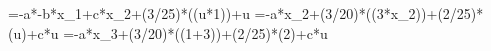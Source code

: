 =-a*-b*x_1+c*x_2+(3/25)*\sin((u*1))+u
=-a*x_2+(3/20)*\sin((3*x_2))+(2/25)*\cos(u)+c*u
=-a*x_3+(3/20)*\sin((1+3))+(2/25)*\cos(2)+c*u
